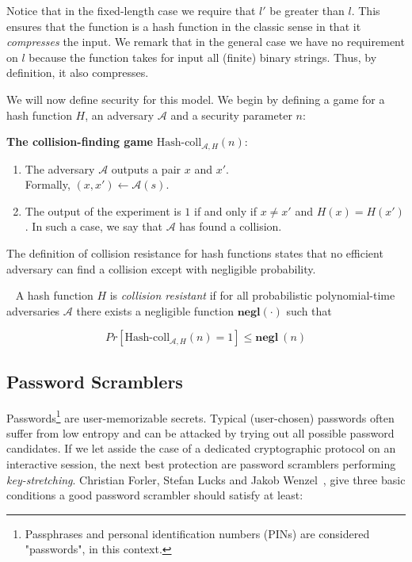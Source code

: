Notice that in the fixed-length case we require that $l'$ be greater than $l$. This ensures that the
function is a hash function in the classic sense in that it \emph{compresses} the input. We remark
that in the general case we have no requirement on $l$ because the function takes for input all (finite) binary strings. Thus, by definition, it also compresses.

We will now define security for this model. We begin by defining a game for a hash function $H$, an adversary $\mathcal{A}$ and a security parameter $n$:

\vspace{0.2cm}
\noindent \textbf{The collision-finding game} $\mbox{Hash-coll}_{\mathcal{A},H}(n)$: ~\cite{Katz:2007:IMC:1206501}
\begin{enumerate}
  \item The adversary $\mathcal{A}$ outputs a pair $x$ and $x'$. \\
  Formally, $(x,x') \leftarrow \mathcal{A}(s)$.
  \item The output of the experiment is $1$ if and only if $x \neq x'$ and $H(x) = H(x')$. In such a case, we say that $\mathcal{A}$ has found a collision.
\end{enumerate}
%
The definition of collision resistance for hash functions states that no efficient adversary can find a collision except with negligible probability.
%
\begin{definition}~\textnormal{\cite{Katz:2007:IMC:1206501}}
  A hash function $H$ is \emph{collision resistant} if for all probabilistic polynomial-time adversaries $\mathcal{A}$ there exists a negligible function $\textbf{negl}(\cdot)$ such that

\begin{equation} \label{eqn:collision}
  Pr[\mbox{Hash-coll}_{\mathcal{A},H}(n) = 1] \leq \textbf{negl} \: (n)
\end{equation}
\end{definition}

\subsection{Password Scramblers}
Passwords\footnote{Passphrases and personal identification numbers (PINs) are considered "passwords", in this context.} are user-memorizable secrets. Typical (user-chosen) passwords often suffer from low entropy and can be attacked by trying out all possible password candidates. If we let asside the case of a dedicated cryptographic protocol on an interactive session, the next best protection are password scramblers performing \emph{key-stretching}. Christian Forler, Stefan Lucks and Jakob Wenzel~\cite{ForlerLW13}, give three basic conditions a good password scrambler should satisfy at least:

